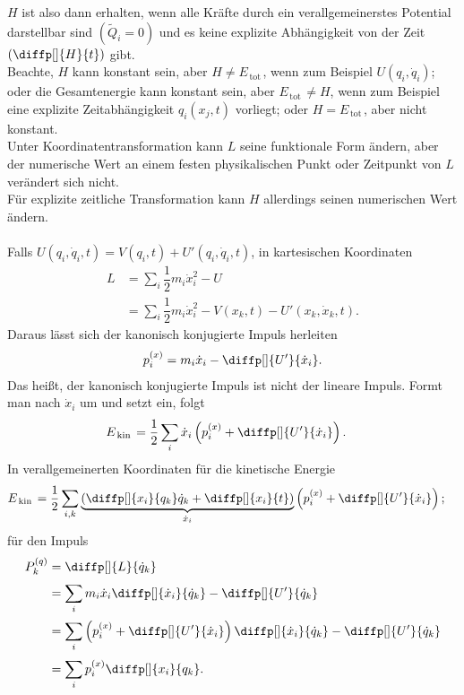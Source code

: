 \documentclass[a4paper,12pt]{article}
\numberwithin{equation}{section}
\begin{document}
$H$ ist also dann erhalten, wenn alle Kräfte durch ein verallgemeinerstes Potential darstellbar sind $\left(\tilde Q_i=0\right)$ und es keine explizite Abhängigkeit von der Zeit $\left(\diffp[]{H}{t}\right)$ gibt.\\\indent
Beachte, $H$ kann konstant sein, aber $H\neq E_{\,\text{tot}\,}$, wenn zum Beispiel $U\left(q_i,\dot{q}_i\right)$; oder die Gesamtenergie kann konstant sein, aber $E_{\,\text{tot}\,}\neq H$, wenn zum Beispiel eine explizite Zeitabhängigkeit $q_i(x_j,t)$ vorliegt; oder $H=E_{\,\text{tot}\,}$, aber nicht konstant.\\\indent
Unter Koordinatentransformation kann $L$ seine funktionale Form ändern, aber der numerische Wert an einem festen physikalischen Punkt oder Zeitpunkt von $L$ verändert sich nicht.\\\indent
Für explizite zeitliche Transformation kann $H$ allerdings seinen numerischen Wert ändern.\\\\\indent
Falls $U(q_i,\dot{q}_i,t)=V(q_i,t)+U'(q_i,\dot{q}_i,t)$, in kartesischen Koordinaten
\begin{align*}
        L&=\sum_{i}^{}\dfrac{1}{2}m_i\dot{x}_i^2-U\\
         &=\sum_{i}^{}\dfrac{1}{2}m_i\dot{x}_i^2-V(x_k,t)-U'(x_k,\dot{x}_k,t)
.\end{align*}
Daraus lässt sich der kanonisch konjugierte Impuls herleiten
\begin{align*}
        p_i^{(x)}=m_i\dot{x}_i-\diffp[]{U'}{\dot{x}_i}
.\end{align*}
Das heißt, der kanonisch konjugierte Impuls ist nicht der lineare Impuls. Formt man nach $\dot{x}_i$ um und setzt ein, folgt
\begin{align*}
        E_{\,\text{kin}\,}&=\dfrac{1}{2}\sum_{i}^{}\dot{x}_i\left(p_i^{(x)}+\diffp[]{U'}{\dot{x}_i}\right)
.\end{align*}
In verallgemeinerten Koordinaten für die kinetische Energie
\begin{align*}
        E_{\,\text{kin}\,}&=\dfrac{1}{2}\sum_{i,k}^{}\underbrace{\left(\diffp[]{x_i}{q_k}\dot{q}_k+\diffp[]{x_i}{t}\right)}_{\dot{x}_i}\left(p_i^{(x)}+\diffp[]{U'}{\dot{x}_i}\right)
;\end{align*}
für den Impuls
\begin{align*}
        P_k^{(q)}&=\diffp[]{L}{\dot{q}_k}\\
                 &=\sum_{i}^{}m_i\dot{x}_i\diffp[]{\dot{x}_i}{\dot{q}_k}-\diffp[]{U'}{\dot{q}_k}\\
                 &=\sum_{i}^{}\left(p_i^{(x)}+\diffp[]{U'}{\dot{x}_i}\right)\diffp[]{\dot{x}_i}{\dot{q}_k}-\diffp[]{U'}{\dot{q}_k}\\
                 &=\sum_{i}^{}p_i^{(x)}\diffp[]{x_i}{q_k}
.\end{align*}
\end{document}
